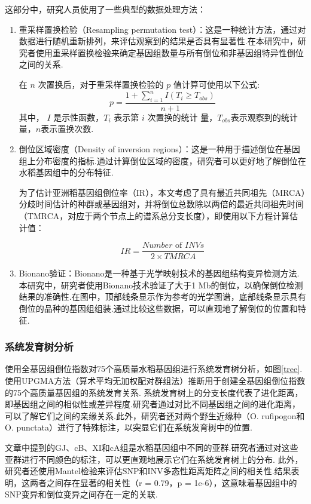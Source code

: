 这部分中，研究人员使用了一些典型的数据处理方法：

\begin{enumerate}
	\item 重采样置换检验（Resampling permutation test）：这是一种统计方法，通过对数据进行随机重新排列，来评估观察到的结果是否具有显著性.在本研究中，研究者使用重采样置换检验来确定基因组数量与所有倒位和非基因组特异性倒位之间的关系.
	
	在 $ n $ 次置换后，对于重采样置换检验的 $ p $ 值计算可使用以下公式:
	$$
	p=\frac{1+\sum_{i=1}^n I\left(T_i \geq T_{o b s}\right)}{n+1}
	$$
	其中， $I$ 是示性函数，$ T_i $ 表示第 $ i $ 次置换的统计 量，$T_{obs}$表示观察到的统计量，$ n $表示置换次数.
	
	\item 倒位区域密度（Density of inversion regions）：这是一种用于描述倒位在基因组上分布密度的指标.通过计算倒位区域的密度，研究者可以更好地了解倒位在水稻基因组中的分布特征.
	
	为了估计亚洲稻基因组倒位率（IR），本文考虑了具有最近共同祖先（MRCA）分歧时间估计的种群或基因组对，并将倒位总数除以两倍的最近共同祖先时间（TMRCA，对应于两个节点上的谱系总分支长度），即使用以下方程计算估计值：
	
	$$
	I R=\frac{N u m b e r \text { of } I N V s}{2 \times T M R C A}
	$$
	
	\item Bionano验证：Bionano是一种基于光学映射技术的基因组结构变异检测方法.本研究中，研究者使用Bionano技术验证了大于1 Mb的倒位，以确保倒位检测结果的准确性.在图中，顶部线条显示作为参考的光学图谱，底部线条显示具有倒位的品种的基因组组装.通过比较这些数据，可以直观地了解倒位的位置和特征.
\end{enumerate}

\subsubsection{系统发育树分析}

使用全基因组倒位指数对75个高质量水稻基因组进行系统发育树分析，如图\ref{tree}.使用UPGMA方法（算术平均无加权配对群组法）推断用于创建全基因组倒位指数的75个高质量基因组的系统发育关系.
系统发育树上的分支长度代表了进化距离，即基因组之间的相似性或差异程度.研究者通过对比不同基因组之间的进化距离，可以了解它们之间的亲缘关系.此外，研究者还对两个野生近缘种（O. rufipogon和O. punctata）进行了特殊标注，以突显它们在系统发育树中的位置.

文章中提到的GJ、cB、XI和cA组是水稻基因组中不同的亚群.研究者通过对这些亚群进行不同颜色的标注，可以更直观地展示它们在系统发育树上的分布.
此外，研究者还使用Mantel检验来评估SNP和INV多态性距离矩阵之间的相关性.结果表明，这两者之间存在显著的相关性（r = 0.79，p = 1e-6），这意味着基因组中的SNP变异和倒位变异之间存在一定的关联.


